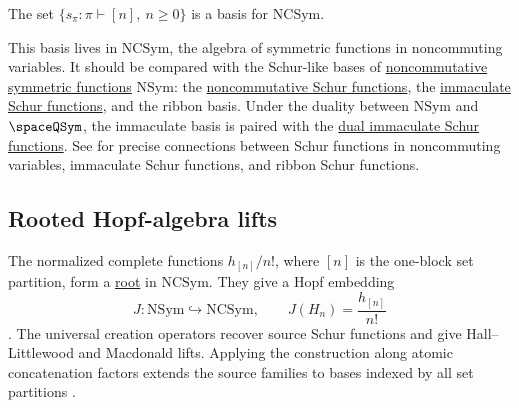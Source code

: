 \begin{theorem}
The set $\{s_\pi : \pi\vdash[n],\ n\geq 0\}$ is a basis for
$\mathrm{NCSym}$.
\end{theorem}

This basis lives in $\mathrm{NCSym}$, the algebra of symmetric functions in
noncommuting variables.  It should be compared with the Schur-like bases of
\hyperref[nonComFunctions]{noncommutative symmetric functions} $\mathrm{NSym}$:
the \hyperref[nonComSchur]{noncommutative Schur functions}, the
\hyperref[immaculateSchur]{immaculate Schur functions}, and the ribbon basis.
Under the duality between $\mathrm{NSym}$ and $\spaceQSym$, the immaculate
basis is paired with the \hyperref[diSchur]{dual immaculate Schur functions}.
See \cite{AliniaeifardLiWilligenburg2022} for precise connections between
Schur functions in noncommuting variables, immaculate Schur functions, and
ribbon Schur functions.

\subsection[ncSchurRootedLifts]{Rooted Hopf-algebra lifts}

The normalized complete functions $h_{[n]}/n!$, where $[n]$ is the
one-block set partition, form a
\hyperref[rootedHopfAlgebra]{root} in $\mathrm{NCSym}$.
They give a Hopf embedding
\[
 J:\mathrm{NSym}\hookrightarrow\mathrm{NCSym},\qquad
 J(H_n)=\frac{h_{[n]}}{n!}
\]
\cite[Prop.~6.1]{AliniaeifardWilligenburg2026x}.
The universal creation operators recover source Schur functions and
give Hall--Littlewood and Macdonald lifts. Applying the construction along
atomic concatenation factors extends the source families to bases indexed
by all set partitions
\cite[Prop.~6.4 and Thm.~6.5]{AliniaeifardWilligenburg2026x}.
